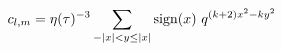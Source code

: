 \begin{equation}
    c_{l,m} = \eta(\tau)^{-3} \sum_{-|x|<y\leq |x|} {\rm sign}(x)
    ~q^{(k+2)x^2 -ky^2}
\end{equation}

